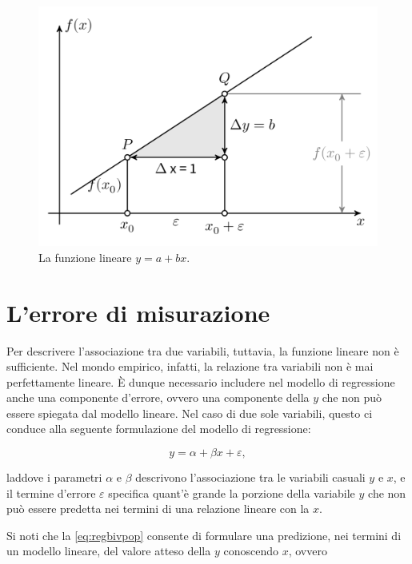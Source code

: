 \documentclass[
]{memoir}
\begin{document}
\begin{figure}

{\centering \includegraphics[width=0.7\linewidth]{images/linear_function} 

}

\caption{La funzione lineare $y = a + bx$.}\label{fig:linearfunction}
\end{figure}

\hypertarget{lerrore-di-misurazione}{%
\section{L'errore di misurazione}\label{lerrore-di-misurazione}}

Per descrivere l'associazione tra due variabili, tuttavia, la funzione lineare non è sufficiente. Nel mondo empirico, infatti, la relazione tra variabili non è mai perfettamente lineare. È dunque necessario includere nel modello di regressione anche una componente d'errore, ovvero una componente della \(y\) che non può essere spiegata dal modello lineare. Nel caso di due sole variabili, questo ci conduce alla seguente formulazione del modello di regressione:

\begin{equation}
y = \alpha + \beta x + \varepsilon,
\label{eq:regbivpop}
\end{equation}

laddove i parametri \(\alpha\) e \(\beta\) descrivono l'associazione tra le variabili casuali \(y\) e \(x\), e il termine d'errore \(\varepsilon\) specifica quant'è grande la porzione della variabile \(y\) che non può essere predetta nei termini di una relazione lineare con la \(x\).

Si noti che la \eqref{eq:regbivpop} consente di formulare una predizione, nei termini di un modello lineare, del valore atteso della \(y\) conoscendo \(x\), ovvero
\end{document}
